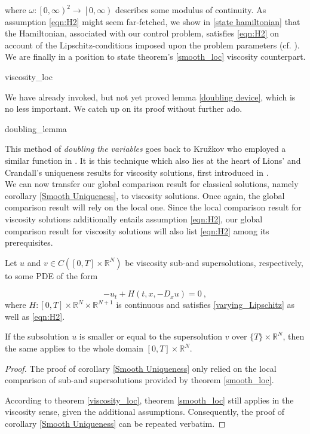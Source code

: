 		 where $ \omega : \left[0, \infty \right)^2 \to \left[0, \infty \right) $ describes some modulus of continuity. As assumption \eqref{eqn:H2} 
		 might seem far-fetched, we show in \ref{state hamiltonian} that the Hamiltonian, associated with our control problem, satisfies \eqref{eqn:H2} on account of the Lipschitz-conditions imposed upon the problem parameters (cf. \cite[p.~167]{zhou}). We are finally in a position to state theorem's \ref{smooth_loc} viscosity counterpart.
		 
		 {viscosity_loc}
		 
		 We have already invoked, but not yet proved lemma \ref{doubling device}, which is no less important. We catch up on its proof without further ado.
		 
		 {doubling_lemma}
		 
		 This method of \emph{doubling the variables} goes back to Kru\v{z}kov who employed a similar function in \cite{kruvzkov}. It is this technique which also lies at the heart of Lions' and Crandall's uniqueness results for viscosity solutions, first introduced in \cite{lions}. \\
		 
		 We can now transfer our global comparison result for classical solutions, namely corollary \ref{Smooth Uniqueness}, to viscosity solutions. Once again, the global comparison result will rely on the local one. Since the local comparison result for viscosity solutions additionally entails assumption  \eqref{eqn:H2}, our global comparison result for viscosity solutions will also list \eqref{eqn:H2} among its prerequisites.
		  
		  \begin{corollary}
		  	\label{Viscosity Uniqueness}
		  	
		  	Let $ u $ and $ v \in C(\left[ 0, T \right] \times \mathbb{R}^{N}) $ be viscosity sub-and supersolutions, respectively, to some PDE of the form
		  	
		  	\begin{equation*}
		  	-u_t + H(t, x, -D_x u) = 0 \ ,
		  	\end{equation*}
		  	where $ H : \left[ 0, T \right] \times \mathbb{R}^{N} \times \mathbb{R}^{N+1} $ is continuous and satisfies \eqref{varying_Lipschitz} as well as \eqref{eqn:H2}.
		  	
		  	If the subsolution $ u $ is smaller or equal to the supersolution $ v $ over $ \{ T \} \times \mathbb{R}^{N} $, then the same applies to the whole domain $ \left[ 0, T \right] \times \mathbb{R}^{N} $.
		  	
		  	\begin{proof}
		  		The proof of corollary \ref{Smooth Uniqueness} only relied on the local comparison of sub-and supersolutions provided by theorem \ref{smooth_loc}. 
		  		
		  		According to theorem \ref{viscosity_loc}, theorem \ref{smooth_loc} still applies in the viscosity sense, given the additional assumptions. Consequently, the proof of corollary \ref{Smooth Uniqueness} can be repeated verbatim.
		  	\end{proof}
		  \end{corollary}
	  
